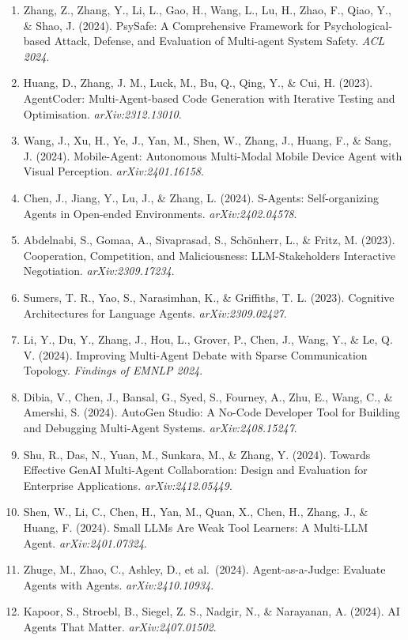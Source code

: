 \begin{enumerate}
\item
  Zhang, Z., Zhang, Y., Li, L., Gao, H., Wang, L., Lu, H., Zhao, F., Qiao, Y., \& Shao, J. (2024). PsySafe: A Comprehensive Framework for Psychological-based Attack, Defense, and Evaluation of Multi-agent System Safety. \emph{ACL 2024}.
\item
  Huang, D., Zhang, J. M., Luck, M., Bu, Q., Qing, Y., \& Cui, H. (2023). AgentCoder: Multi-Agent-based Code Generation with Iterative Testing and Optimisation. \emph{arXiv:2312.13010}.
\item
  Wang, J., Xu, H., Ye, J., Yan, M., Shen, W., Zhang, J., Huang, F., \& Sang, J. (2024). Mobile-Agent: Autonomous Multi-Modal Mobile Device Agent with Visual Perception. \emph{arXiv:2401.16158}.
\item
  Chen, J., Jiang, Y., Lu, J., \& Zhang, L. (2024). S-Agents: Self-organizing Agents in Open-ended Environments. \emph{arXiv:2402.04578}.
\item
  Abdelnabi, S., Gomaa, A., Sivaprasad, S., Schönherr, L., \& Fritz, M. (2023). Cooperation, Competition, and Maliciousness: LLM-Stakeholders Interactive Negotiation. \emph{arXiv:2309.17234}.
\item
  Sumers, T. R., Yao, S., Narasimhan, K., \& Griffiths, T. L. (2023). Cognitive Architectures for Language Agents. \emph{arXiv:2309.02427}.
\item
  Li, Y., Du, Y., Zhang, J., Hou, L., Grover, P., Chen, J., Wang, Y., \& Le, Q. V. (2024). Improving Multi-Agent Debate with Sparse Communication Topology. \emph{Findings of EMNLP 2024}.
\item
  Dibia, V., Chen, J., Bansal, G., Syed, S., Fourney, A., Zhu, E., Wang, C., \& Amershi, S. (2024). AutoGen Studio: A No-Code Developer Tool for Building and Debugging Multi-Agent Systems. \emph{arXiv:2408.15247}.
\item
  Shu, R., Das, N., Yuan, M., Sunkara, M., \& Zhang, Y. (2024). Towards Effective GenAI Multi-Agent Collaboration: Design and Evaluation for Enterprise Applications. \emph{arXiv:2412.05449}.
\item
  Shen, W., Li, C., Chen, H., Yan, M., Quan, X., Chen, H., Zhang, J., \& Huang, F. (2024). Small LLMs Are Weak Tool Learners: A Multi-LLM Agent. \emph{arXiv:2401.07324}.
\item
  Zhuge, M., Zhao, C., Ashley, D., et al.~(2024). Agent-as-a-Judge: Evaluate Agents with Agents. \emph{arXiv:2410.10934}.
\item
  Kapoor, S., Stroebl, B., Siegel, Z. S., Nadgir, N., \& Narayanan, A. (2024). AI Agents That Matter. \emph{arXiv:2407.01502}.

\end{enumerate}
